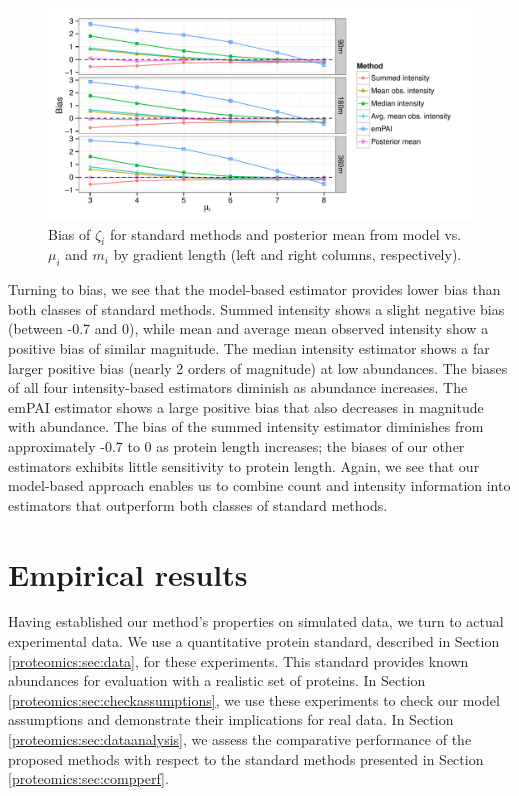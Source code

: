 \begin{figure}
\centering
\includegraphics[width=\textwidth, page=3]{figures/proteomics/figures_bias_sim}
\caption{Bias of $\hat{\zeta}_i$ for standard methods and posterior mean from model vs. $\mu_i$ and $m_i$ by gradient length (left and right columns, respectively).
\label{proteomics:fig:compare_bias}}
\end{figure}
%
Turning to bias, we see that the model-based estimator provides lower bias than both classes of standard methods.
Summed intensity shows a slight negative bias (between -0.7 and 0), while mean and average mean observed intensity show a positive bias of similar magnitude.
The median intensity estimator shows a far larger positive bias (nearly 2 orders of magnitude) at low abundances.
The biases of all four intensity-based estimators diminish as abundance increases.
The emPAI estimator shows a large positive bias that also decreases in magnitude with abundance.
The bias of the summed intensity estimator diminishes from approximately -0.7 to 0 as protein length increases; the biases of our other estimators exhibits little sensitivity to protein length.
Again, we see that our model-based approach enables us to combine count and intensity information into estimators that outperform both classes of standard methods.



\section{Empirical results}
\label{proteomics:sec:empirical}

Having established our method's properties on simulated data, we turn to actual experimental data.
We use a quantitative protein standard, described in Section \ref{proteomics:sec:data}, for these experiments.
This standard provides known abundances for evaluation with a realistic set of proteins.
In Section \ref{proteomics:sec:checkassumptions}, we use these experiments to check our model assumptions and demonstrate their implications for real data.
In Section \ref{proteomics:sec:dataanalysis}, we assess the comparative performance of the proposed methods with respect to the standard methods presented in Section \ref{proteomics:sec:compperf}.

